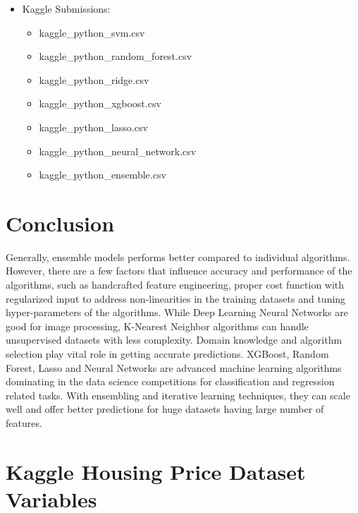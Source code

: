 \documentclass[sigconf]{acmart}
\begin{document}
\begin{itemize}
        \item Kaggle Submissions:
        \begin{itemize}
        	\item kaggle\_python\_svm.csv
			\item kaggle\_python\_random\_forest.csv
			\item kaggle\_python\_ridge.csv
			\item kaggle\_python\_xgboost.csv
			\item kaggle\_python\_lasso.csv
			\item kaggle\_python\_neural\_network.csv
			\item kaggle\_python\_ensemble.csv
        \end{itemize}    	
	\end{itemize}    
   
   
	\section{Conclusion}
	
	Generally, ensemble models performs better compared to individual algorithms. However, there are a few factors that influence accuracy and performance of the algorithms, such as handcrafted feature engineering, proper cost function with regularized input to address non-linearities in the training datasets and tuning hyper-parameters of the algorithms. While Deep Learning Neural Networks are good for image processing, K-Nearest Neighbor algorithms can handle unsupervised datasets with less complexity. Domain knowledge and algorithm selection play vital role in getting accurate predictions. XGBoost, Random Forest, Lasso and Neural Networks are advanced machine learning algorithms dominating in the data science competitions for classification and regression related tasks. With ensembling and iterative learning techniques, they can scale well and offer better predictions for huge datasets having large number of features. 
		
	\appendix
	
	\section{Kaggle Housing Price Dataset Variables}
	
\end{document}
